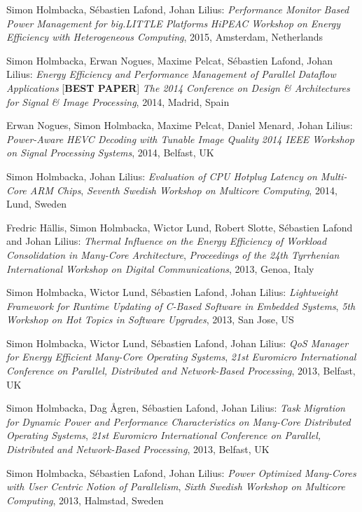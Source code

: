\documentclass[margin,line]{resume}
\begin{document}
\begin{resume}
Simon Holmbacka, S\'{e}bastien Lafond, Johan Lilius:
\textit{Performance Monitor Based Power Management for big.LITTLE Platforms}
\textsl{HiPEAC Workshop on Energy Efficiency with Heterogeneous Computing}, 2015, Amsterdam, Netherlands

Simon Holmbacka, Erwan Nogues, Maxime Pelcat, S\'{e}bastien Lafond, Johan Lilius:
\textit{Energy Efficiency and Performance Management of Parallel Dataflow Applications} [\textbf{BEST PAPER}]
\textsl{The 2014 Conference on Design \& Architectures for Signal \& Image Processing}, 2014, Madrid, Spain

Erwan Nogues, Simon Holmbacka, Maxime Pelcat, Daniel Menard, Johan Lilius:
\textit{Power-Aware HEVC Decoding with Tunable Image Quality}
\textsl{2014 IEEE Workshop on Signal Processing Systems}, 2014, Belfast, UK

Simon Holmbacka, Johan Lilius: 
\textit{Evaluation of CPU Hotplug Latency on Multi-Core ARM Chips},
\textsl{Seventh Swedish Workshop on Multicore Computing}, 2014, Lund, Sweden 

Fredric H\"{a}llis, Simon Holmbacka, Wictor Lund, Robert Slotte, S\'{e}bastien Lafond and Johan Lilius:
\textit{Thermal Influence on the Energy Efficiency of Workload Consolidation in Many-Core Architecture}, 
\textsl{Proceedings of the 24th Tyrrhenian International Workshop on Digital Communications}, 2013, Genoa, Italy 

Simon Holmbacka, Wictor Lund, S\'{e}bastien Lafond, Johan Lilius: 
\textit{Lightweight Framework for Runtime Updating of C-Based Software in Embedded Systems},
\textsl{5th Workshop on Hot Topics in Software Upgrades}, 2013, San Jose, US

Simon Holmbacka, Wictor Lund, S\'{e}bastien Lafond, Johan Lilius: 
\textit{QoS Manager for Energy Efficient Many-Core Operating Systems},
\textsl{21st Euromicro International Conference on Parallel, Distributed and Network-Based Processing}, 2013, Belfast, UK

Simon Holmbacka, Dag \AA{}gren, S\'{e}bastien Lafond, Johan Lilius: 
\textit{Task Migration for Dynamic Power and Performance Characteristics on Many-Core Distributed Operating Systems},
\textsl{21st Euromicro International Conference on Parallel, Distributed and Network-Based Processing}, 2013, Belfast, UK

Simon Holmbacka, S\'{e}bastien Lafond, Johan Lilius: 
\textit{Power Optimized Many-Cores with User Centric Notion of Parallelism},
\textsl{Sixth Swedish Workshop on Multicore Computing}, 2013, Halmstad, Sweden
  

\end{resume}
\end{document}
